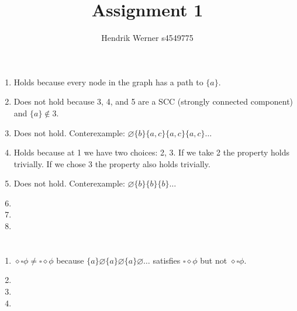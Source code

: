 \documentclass[12pt, a4paper]{article}
\title{Assignment 1}
\author{Hendrik Werner s4549775}
\begin{document}
\maketitle

\section{} %
\begin{enumerate}[a]
	\item %
	Holds because every node in the graph has a path to $\{a\}$.
	\item %
	Does not hold because 3, 4, and 5 are a SCC (strongly connected component) and $\{a\} \not \in 3$.
	\item %
	Does not hold. Conterexample: $\varnothing \{b\} \{a, c\} \{a, c\} \{a, c\} \dots$
	\item %
	Holds because at 1 we have two choices: 2, 3. If we take 2 the property holds trivially. If we chose 3 the property also holds trivially.
	\item %
	Does not hold. Conterexample: $\varnothing \{b\} \{b\} \{b\} \dots$
	\item %
	\item %
	\item %
\end{enumerate}

\section{} %
\begin{enumerate}[a]
	\item %
	$\diamond \square \phi \neq \square \diamond \phi$ because $\{a\} \varnothing \{a\} \varnothing \{a\} \varnothing \dots$ satisfies $\square \diamond \phi$ but not $\diamond \square \phi$.
	\item %
	\item %
	\item %
\end{enumerate}
\end{document}
